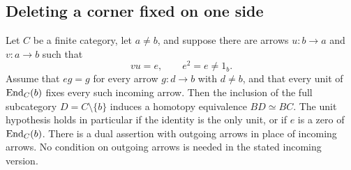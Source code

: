 \subsection{Deleting a corner fixed on one side}

\begin{lemma}
\label{C:one-sided-corner-deletion}
Let $C$ be a finite category, let $a\ne b$, and suppose there are
arrows $u:b\to a$ and $v:a\to b$ such that
\[
 vu=e,\qquad e^2=e\ne1_b.
\]
Assume that $eg=g$ for every arrow $g:d\to b$ with $d\ne b$,
and that every unit of $\operatorname{End}_C(b)$ fixes every such incoming arrow.
Then the inclusion of the full subcategory $D=C\setminus\{b\}$
induces a homotopy equivalence $BD\simeq BC$.
The unit hypothesis holds in particular if the identity is the
only unit, or if $e$ is a zero of $\operatorname{End}_C(b)$.
There is a dual assertion with outgoing arrows in place of incoming
arrows.  No condition on outgoing arrows is needed in the stated
incoming version.
\end{lemma}

